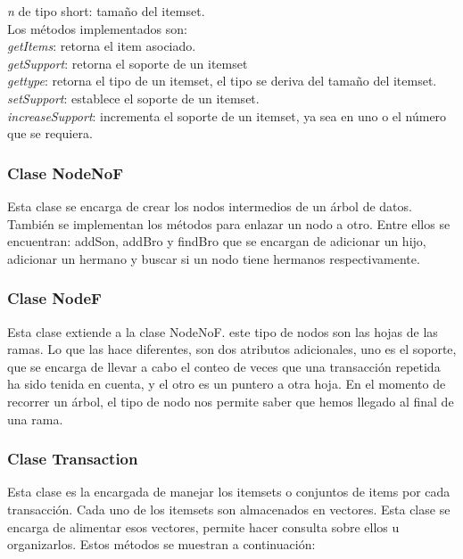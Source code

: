  \textit{n} de tipo short: tama\~no del itemset.\\

 Los m\'etodos implementados son:\\

 \textit{getItems}: retorna el item asociado.\\

 \textit{getSupport}: retorna el soporte de un itemset\\

 \textit{gettype}: retorna el tipo de un itemset, el tipo se deriva del tama\~no del itemset.\\

 \textit{setSupport}: establece el soporte de un itemset.\\

 \textit{increaseSupport}: incrementa el soporte de un itemset, ya sea en uno o el n\'umero que se
requiera.

\subsubsection{Clase NodeNoF}
Esta clase se encarga de crear los nodos intermedios de un \'arbol de datos. Tambi\'en se implementan
los m\'etodos para enlazar un nodo a otro. Entre ellos se encuentran: addSon, addBro y findBro que se encargan de
adicionar un hijo, adicionar un hermano y buscar si un nodo tiene hermanos respectivamente.

\subsubsection{Clase NodeF}
Esta clase extiende a la clase NodeNoF. este tipo de nodos son las hojas de las ramas. Lo que las hace
diferentes, son dos atributos adicionales, uno es el soporte, que se encarga de llevar a cabo el conteo de veces
que una transacci\'on repetida ha sido tenida en cuenta, y el otro es un puntero a otra hoja. En el momento de
recorrer un \'arbol, el tipo de nodo nos permite saber que hemos llegado al final de una rama.

\subsubsection{Clase Transaction}
Esta clase es la encargada de manejar los itemsets o conjuntos de items por cada transacci\'on. Cada uno
de los itemsets son almacenados en vectores. Esta clase se encarga de alimentar esos vectores, permite hacer
consulta sobre ellos u organizarlos. Estos m\'etodos se muestran a continuaci\'on:\\

